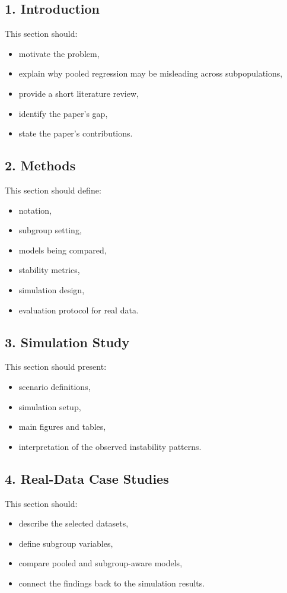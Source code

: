 \documentclass[11pt]{article}
\begin{document}
\subsection*{1. Introduction}
This section should:
\begin{itemize}
    \item motivate the problem,
    \item explain why pooled regression may be misleading across subpopulations,
    \item provide a short literature review,
    \item identify the paper's gap,
    \item state the paper's contributions.
\end{itemize}

\subsection*{2. Methods}
This section should define:
\begin{itemize}
    \item notation,
    \item subgroup setting,
    \item models being compared,
    \item stability metrics,
    \item simulation design,
    \item evaluation protocol for real data.
\end{itemize}

\subsection*{3. Simulation Study}
This section should present:
\begin{itemize}
    \item scenario definitions,
    \item simulation setup,
    \item main figures and tables,
    \item interpretation of the observed instability patterns.
\end{itemize}

\subsection*{4. Real-Data Case Studies}
This section should:
\begin{itemize}
    \item describe the selected datasets,
    \item define subgroup variables,
    \item compare pooled and subgroup-aware models,
    \item connect the findings back to the simulation results.
\end{itemize}
\end{document}
